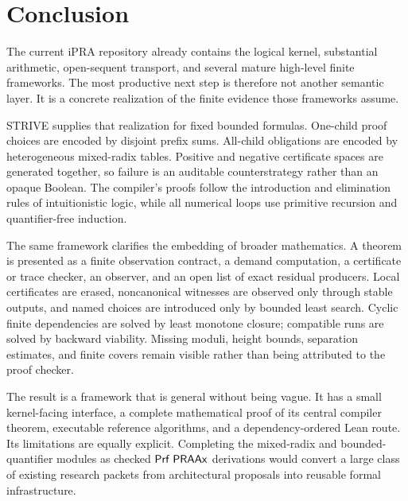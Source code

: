 \section{Conclusion}

The current iPRA repository already contains the logical kernel, substantial
arithmetic, open-sequent transport, and several mature high-level finite
frameworks.  The most productive next step is therefore not another semantic
layer.  It is a concrete realization of the finite evidence those frameworks
assume.

STRIVE supplies that realization for fixed bounded formulas.  One-child proof
choices are encoded by disjoint prefix sums.  All-child obligations are encoded
by heterogeneous mixed-radix tables.  Positive and negative certificate spaces
are generated together, so failure is an auditable counterstrategy rather than
an opaque Boolean.  The compiler's proofs follow the introduction and
elimination rules of intuitionistic logic, while all numerical loops use
primitive recursion and quantifier-free induction.

The same framework clarifies the embedding of broader mathematics.  A theorem
is presented as a finite observation contract, a demand computation, a
certificate or trace checker, an observer, and an open list of exact residual
producers.  Local certificates are erased, noncanonical witnesses are observed
only through stable outputs, and named choices are introduced only by bounded
least search.  Cyclic finite dependencies are solved by least monotone closure;
compatible runs are solved by backward viability.  Missing moduli, height
bounds, separation estimates, and finite covers remain visible rather than
being attributed to the proof checker.

The result is a framework that is general without being vague.  It has a small
kernel-facing interface, a complete mathematical proof of its central compiler
theorem, executable reference algorithms, and a dependency-ordered Lean route.
Its limitations are equally explicit.  Completing the mixed-radix and bounded-
quantifier modules as checked \(\mathsf{Prf}\;\mathsf{PRAAx}\) derivations would convert a large
class of existing research packets from architectural proposals into reusable
formal infrastructure.
